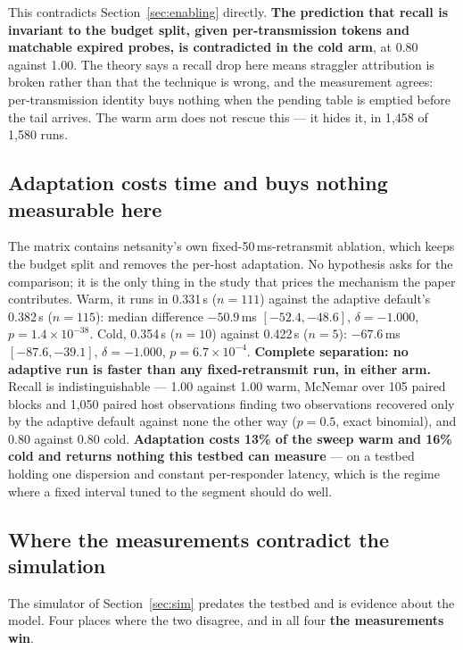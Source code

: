 \documentclass[conference]{IEEEtran}
\newcommand{\netsanity}{\textsf{netsanity}}
\begin{document}
This contradicts Section~\ref{sec:enabling} directly. \textbf{The prediction
that recall is invariant to the budget split, given per-transmission tokens and
matchable expired probes, is contradicted in the cold arm}, at 0.80 against
1.00. The theory says a recall drop here means straggler attribution is broken
rather than that the technique is wrong, and the measurement agrees:
per-transmission identity buys nothing when the pending table is emptied before
the tail arrives. The warm arm does not rescue this --- it hides it, in
1{,}458 of 1{,}580 runs.

\subsection{Adaptation costs time and buys nothing measurable here}
\label{sec:ablation}

The matrix contains \netsanity{}'s own fixed-50\,ms-retransmit ablation, which
keeps the budget split and removes the per-host adaptation. No hypothesis asks
for the comparison; it is the only thing in the study that prices the mechanism
the paper contributes. Warm, it runs in 0.331\,s ($n=111$) against the adaptive
default's 0.382\,s ($n=115$): median difference $-50.9$\,ms $[-52.4,-48.6]$,
$\delta=-1.000$, $p=1.4\times10^{-38}$. Cold, 0.354\,s ($n=10$) against
0.422\,s ($n=5$): $-67.6$\,ms $[-87.6,-39.1]$, $\delta=-1.000$,
$p=6.7\times10^{-4}$. \textbf{Complete separation: no adaptive run is faster
than any fixed-retransmit run, in either arm.} Recall is indistinguishable ---
1.00 against 1.00 warm, McNemar over 105 paired blocks and 1{,}050 paired host
observations finding two observations recovered only by the adaptive default
against none the other way ($p=0.5$, exact binomial), and 0.80 against 0.80
cold. \textbf{Adaptation costs 13\% of the sweep warm and 16\% cold and returns
nothing this testbed can measure} --- on a testbed holding one dispersion and
constant per-responder latency, which is the regime where a fixed interval
tuned to the segment should do well.

\subsection{Where the measurements contradict the simulation}
\label{sec:vs-sim}

The simulator of Section~\ref{sec:sim} predates the testbed and is evidence
about the model. Four places where the two disagree, and in all four
\textbf{the measurements win}.
\end{document}
